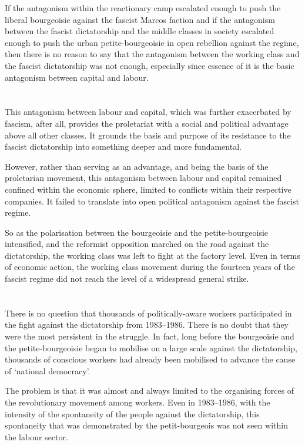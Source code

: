 If the antagonism within the reactionary camp 
escalated enough
to push the liberal bourgeoisie against the fascist Marcos faction
and 
if the antagonism between the fascist dictatorship 
and the middle classes in society 
escalated enough 
to push the urban petite-bourgeoisie 
in open rebellion against the regime, 
then 
there is no reason to say that the antagonism 
between the working class and the fascist dictatorship was not enough, 
especially since essence of it 
is the basic antagonism between capital and labour.


\section{}
This antagonism between labour and capital, 
which was further exacerbated by fascism, 
after all, 
provides the proletariat with 
a social and political advantage
above all other classes.
It grounds the basis and purpose of its resistance 
to the fascist dictatorship 
into something deeper and more fundamental.

However, rather than serving as an advantage,
and being the basis of the proletarian movement, 
this antagonism between labour and capital 
remained confined within the economic sphere,
limited to conflicts within their respective companies.
It failed to translate into open political antagonism against the fascist regime.

So as the polarisation between the bourgeoisie 
and the petite-bourgeoisie intensified, 
and the reformist opposition marched on the road against the dictatorship, 
the working class was left to fight at the factory level. 
Even in terms of economic action, 
the working class movement during the fourteen years of the fascist regime 
did not reach the level of a widespread general strike.


\section{}
There is no question 
that thousands of politically-aware workers 
participated in the fight
against the dictatorship from 1983--1986.
There is no doubt
that they were the most persistent in the struggle.
In fact, 
long before the bourgeoisie and the petite-bourgeoisie 
began to mobilise on a large scale against the dictatorship,
thousands of conscious workers had already been mobilised
to advance the cause of `national democracy'.

The problem is that 
it was almost and always limited 
to the organising forces of the revolutionary movement among workers.
Even in 1983--1986, 
with the intensity of the spontaneity of the people against the dictatorship,
this spontaneity that was demonstrated by the petit-bourgeois
was not seen within the labour sector.

